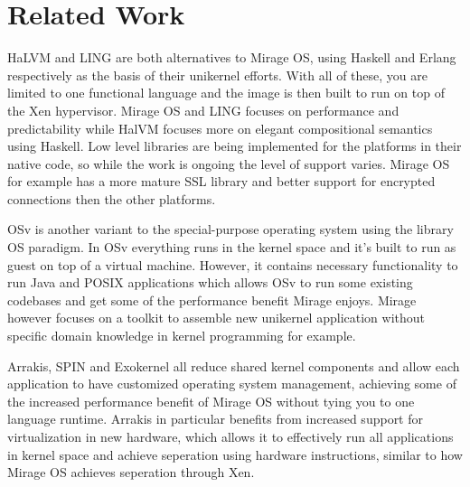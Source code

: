 \documentclass[english,10pt,twocolumn]{article}
\begin{document}
\section{Related Work}

HaLVM\cite{halvm} and LING\cite{ling} are both alternatives to Mirage OS, using Haskell and Erlang respectively as the basis of their unikernel efforts.
With all of these, you are limited to one functional language and the image is then built to run on top of the Xen hypervisor.
Mirage OS and LING focuses on performance and predictability while HalVM focuses more on elegant compositional semantics using Haskell.
Low level libraries are being implemented for the platforms in their native code, so while the work is ongoing the level of support varies.
Mirage OS for example has a more mature SSL library and better support for encrypted connections then the other platforms.

OSv\cite{osv} is another variant to the special-purpose operating system using the library OS paradigm.
In OSv everything runs in the kernel space and it's built to run as guest on top of a virtual machine.
However, it contains necessary functionality to run Java and POSIX applications which allows OSv to run some existing codebases and get some of the performance benefit Mirage enjoys.
Mirage however focuses on a toolkit to assemble new unikernel application without specific domain knowledge in kernel programming for example.

Arrakis\cite{arrakis}, SPIN\cite{spin} and Exokernel\cite{exokernel} all reduce shared kernel components and allow each application to have customized operating system management, achieving some of the increased performance benefit of Mirage OS without tying you to one language runtime.
Arrakis in particular benefits from increased support for virtualization in new hardware, which allows it to effectively run all applications in kernel space and achieve seperation using hardware instructions, similar to how Mirage OS achieves seperation through Xen.




\end{document}
